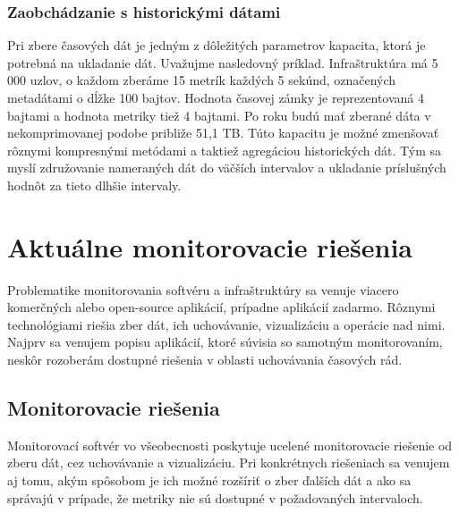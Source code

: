 \documentclass[12pt,twoside,color,cover,table]{fithesis3}
\begin{document}
\subsection{Zaobchádzanie s historickými dátami}
\label{sec:example}
Pri zbere časových dát je jedným z dôležitých parametrov kapacita, ktorá je potrebná na ukladanie dát. Uvažujme nasledovný príklad. Infraštruktúra má 5 000 uzlov, o každom zberáme 15 metrík každých 5 sekúnd,
označených metadátami o dĺžke 100 bajtov. Hodnota časovej zámky je reprezentovaná 4 bajtami a hodnota metriky tiež 4 bajtami. Po roku budú mať zberané dáta v nekomprimovanej podobe približe 51,1 TB. Túto kapacitu
je možné zmenšovať rôznymi kompresnými metódami a taktiež agregáciou historických dát. Tým sa myslí združovanie nameraných dát do väčších intervalov a ukladanie príslušných hodnôt za tieto dlhšie intervaly.

\chapter{Aktuálne monitorovacie riešenia}
Problematike monitorovania softvéru a infraštruktúry sa venuje viacero komerčných alebo open-source aplikácií, prípadne aplikácií zadarmo. Rôznymi technológiami riešia zber dát, ich uchovávanie, vizualizáciu a operácie nad
nimi. Najprv sa venujem popisu aplikácií, ktoré súvisia so samotným monitorovaním, neskôr rozoberám dostupné riešenia v oblasti uchovávania časových rád.

\section{Monitorovacie riešenia}
Monitorovací softvér vo všeobecnosti poskytuje ucelené monitorovacie riešenie od zberu dát, cez uchovávanie a vizualizáciu. Pri konkrétnych riešeniach sa venujem aj tomu, akým spôsobom je ich možné
rozšíriť o zber ďalších dát a ako sa správajú v prípade, že metriky nie sú dostupné v požadovaných intervaloch.
\end{document}
